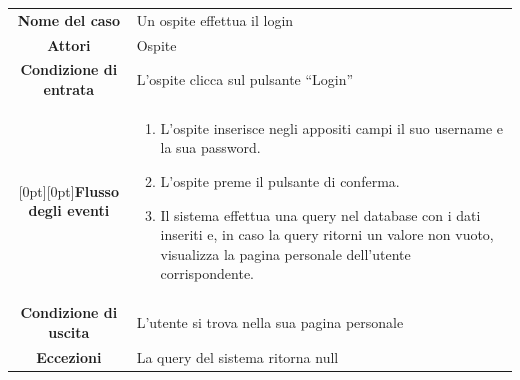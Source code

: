 \documentclass[a4paper,12pt]{article}
\begin{document}
\clearpage
\begin{tabularx}{\textwidth}{|c|X|}
\rowcolor[gray]{.9}\hline \textbf{Nome del caso} & Un ospite effettua il login \\
\rowcolor[gray]{.9}\hline \textbf{Attori} & Ospite \\ 
\rowcolor[gray]{.9}\hline \textbf{Condizione di entrata} & L'ospite clicca sul pulsante “Login” \\
\rowcolor[gray]{.9}\hline \raisebox{-10ex}[0pt][0pt]{\textbf{Flusso degli eventi}} & 
\begin{enumerate}
\itemsep0em 
\item L'ospite inserisce negli appositi campi il suo username e la sua password.
\item L'ospite preme il pulsante di conferma.
\item Il sistema effettua una query nel database con i dati inseriti e, in caso la query ritorni un valore non vuoto, visualizza la pagina personale dell'utente corrispondente.
\end{enumerate}
 \\ 
\rowcolor[gray]{.9}\hline \textbf{Condizione di uscita} & L'utente si trova nella sua pagina personale \\
\rowcolor[gray]{.9}\hline \textbf{Eccezioni} & La query del sistema ritorna null
\\
\hline 
\end{tabularx} \\[1\baselineskip]
\end{document}
